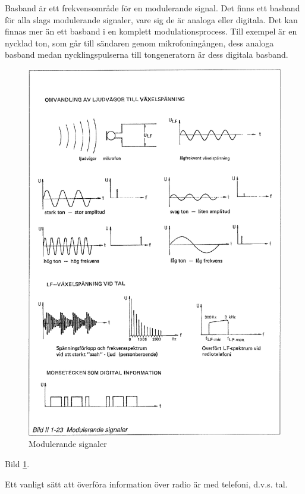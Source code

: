 Basband är ett frekvensområde för en modulerande signal. Det finns ett basband
för alla slags modulerande signaler, vare sig de är analoga eller digitala. Det
kan finnas mer än ett basband i en komplett modulationsprocess. Till exempel är
en nycklad ton, som går till sändaren genom mikrofoningången, dess analoga
basband medan nycklingspulserna till tongeneratorn är dess digitala basband.

\begin{figure}[ht]
\begin{center}
\includegraphics[width=14cm]{images/bild_2_1-23}
\caption{Modulerande signaler}
\label{fig:BildII1-23}
\end{center}
\end{figure}

Bild \ref{fig:BildII1-23}.

Ett vanligt sätt att överföra information över radio är med telefoni, d.v.s.
tal.

